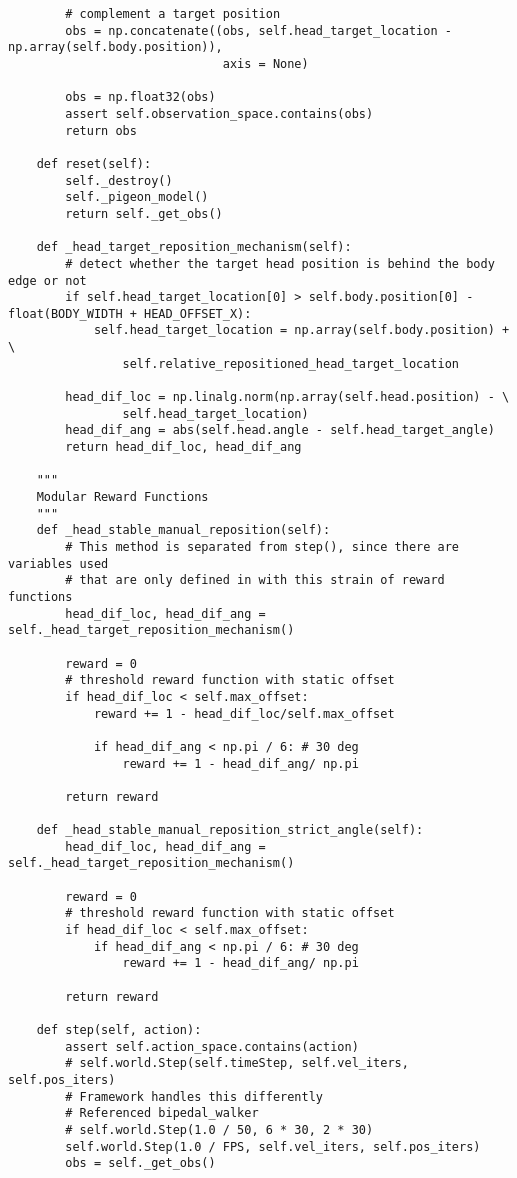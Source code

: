 \begin{lstlisting}
        # complement a target position
        obs = np.concatenate((obs, self.head_target_location - np.array(self.body.position)),
                              axis = None)

        obs = np.float32(obs)
        assert self.observation_space.contains(obs)
        return obs

    def reset(self):
        self._destroy()
        self._pigeon_model()
        return self._get_obs()

    def _head_target_reposition_mechanism(self):
        # detect whether the target head position is behind the body edge or not
        if self.head_target_location[0] > self.body.position[0] - float(BODY_WIDTH + HEAD_OFFSET_X):
            self.head_target_location = np.array(self.body.position) + \
                self.relative_repositioned_head_target_location

        head_dif_loc = np.linalg.norm(np.array(self.head.position) - \
                self.head_target_location)
        head_dif_ang = abs(self.head.angle - self.head_target_angle)
        return head_dif_loc, head_dif_ang

    """
    Modular Reward Functions
    """
    def _head_stable_manual_reposition(self):
        # This method is separated from step(), since there are variables used
        # that are only defined in with this strain of reward functions
        head_dif_loc, head_dif_ang = self._head_target_reposition_mechanism()

        reward = 0
        # threshold reward function with static offset
        if head_dif_loc < self.max_offset:
            reward += 1 - head_dif_loc/self.max_offset

            if head_dif_ang < np.pi / 6: # 30 deg
                reward += 1 - head_dif_ang/ np.pi

        return reward

    def _head_stable_manual_reposition_strict_angle(self):
        head_dif_loc, head_dif_ang = self._head_target_reposition_mechanism()

        reward = 0
        # threshold reward function with static offset
        if head_dif_loc < self.max_offset:
            if head_dif_ang < np.pi / 6: # 30 deg
                reward += 1 - head_dif_ang/ np.pi

        return reward

    def step(self, action):
        assert self.action_space.contains(action)
        # self.world.Step(self.timeStep, self.vel_iters, self.pos_iters)
        # Framework handles this differently
        # Referenced bipedal_walker
        # self.world.Step(1.0 / 50, 6 * 30, 2 * 30)
        self.world.Step(1.0 / FPS, self.vel_iters, self.pos_iters)
        obs = self._get_obs()


\end{lstlisting}
